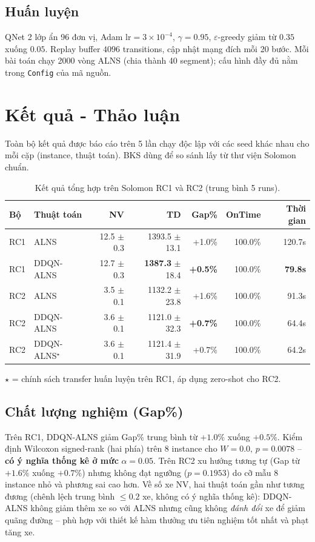 \documentclass[13pt, a4paper]{extarticle} %
\begin{document}
\subsection{Huấn luyện}
QNet 2 lớp ẩn 96 đơn vị, Adam $\text{lr}=3\times 10^{-4}$, $\gamma=0.95$, $\varepsilon$-greedy giảm từ $0.35$ xuống $0.05$. Replay buffer $4096$ transitions, cập nhật mạng đích mỗi 20 bước. Mỗi bài toán chạy 2000 vòng ALNS (chia thành 40 segment); cấu hình đầy đủ nằm trong \texttt{Config} của mã nguồn.

\section{Kết quả - Thảo luận}

Toàn bộ kết quả được báo cáo trên 5 lần chạy độc lập với các seed khác nhau cho mỗi cặp (instance, thuật toán). BKS dùng để so sánh lấy từ thư viện Solomon chuẩn.

\begin{table}[h]
\centering
\caption{Kết quả tổng hợp trên Solomon RC1 và RC2 (trung bình 5 runs).}
\label{tab:summary}
\begin{tabular}{llrrrrr}
\toprule
\textbf{Bộ} & \textbf{Thuật toán} & \textbf{NV} & \textbf{TD} & \textbf{Gap\%} & \textbf{OnTime} & \textbf{Thời gian} \\
\midrule
RC1 & ALNS        & 12.5 $\pm$ 0.3 & 1393.5 $\pm$ 13.1 & +1.0\% & 100.0\% & 120.7s \\
RC1 & DDQN-ALNS   & 12.7 $\pm$ 0.3 & \textbf{1387.3} $\pm$ 18.4 & \textbf{+0.5\%} & 100.0\% & \textbf{79.8s} \\
\midrule
RC2 & ALNS        & 3.5 $\pm$ 0.1  & 1132.2 $\pm$ 23.8 & +1.6\% & 100.0\% & 91.3s \\
RC2 & DDQN-ALNS   & 3.6 $\pm$ 0.1  & 1121.0 $\pm$ 32.3 & \textbf{+0.7\%} & 100.0\% & 64.4s \\
RC2 & DDQN-ALNS$^\star$ & 3.6 $\pm$ 0.1 & 1121.4 $\pm$ 31.9 & +0.7\% & 100.0\% & 64.2s \\
\bottomrule
\end{tabular}
\vspace{0.2em}

\small $\star$ = chính sách transfer huấn luyện trên RC1, áp dụng zero-shot cho RC2.
\end{table}

\subsection{Chất lượng nghiệm (Gap\%)}
Trên RC1, DDQN-ALNS giảm Gap\% trung bình từ $+1.0\%$ xuống $+0.5\%$. Kiểm định Wilcoxon signed-rank (hai phía) trên 8 instance cho $W=0.0,\, p=0.0078$ -- \textbf{có ý nghĩa thống kê ở mức} $\alpha = 0.05$. Trên RC2 xu hướng tương tự (Gap từ $+1.6\%$ xuống $+0.7\%$) nhưng không đạt ngưỡng ($p=0.1953$) do cỡ mẫu 8 instance nhỏ và phương sai cao hơn. Về số xe NV, hai thuật toán gần như tương đương (chênh lệch trung bình $\le 0.2$ xe, không có ý nghĩa thống kê): DDQN-ALNS không giảm thêm xe so với ALNS nhưng cũng không \textit{đánh đổi} xe để giảm quãng đường -- phù hợp với thiết kế hàm thưởng ưu tiên nghiệm tốt nhất và phạt tăng xe.
\end{document}
